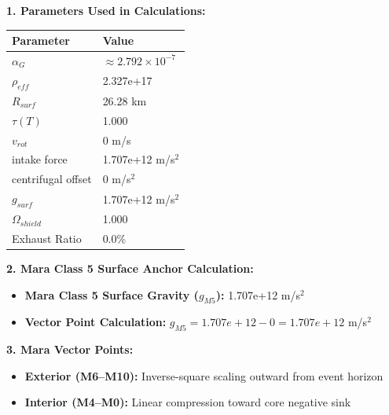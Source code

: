 \documentclass[11pt, a4paper]{article}
\begin{document}
\vspace{0.5em}
\noindent \textbf{1. Parameters Used in Calculations:}
\begin{center}
  \begin{tabular}{|l|l|}
    \hline
    \textbf{Parameter} & \textbf{Value} \\ \hline
    $\alpha_G$ & $\approx 2.792 \times 10^{-7}$ \\ \hline
    $\rho_{eff}$ & 2.327e+17 \\ \hline
    $R_{surf}$ & 26.28 km \\ \hline
    $\tau(T)$ & 1.000 \\ \hline
    $v_{rot}$ & 0 m/s \\ \hline
    intake force & 1.707e+12 m/s$^2$ \\ \hline
    centrifugal offset & 0 m/s$^2$ \\ \hline
    $g_{surf}$ & 1.707e+12 m/s$^2$ \\ \hline
    $\Omega_{shield}$ & 1.000 \\ \hline
    Exhaust Ratio & 0.0\% \\ \hline
  \end{tabular}
\end{center}

\vspace{0.5em}
\noindent \textbf{2. Mara Class 5 Surface Anchor Calculation:}
\begin{itemize}
  \item \textbf{Mara Class 5 Surface Gravity ($g_{M5}$):} 1.707e+12 m/s$^2$
  \item \textbf{Vector Point Calculation:} $g_{M5} = 1.707e+12 - 0 = 1.707e+12$ m/s$^2$
\end{itemize}

\vspace{0.5em}
\noindent \textbf{3. Mara Vector Points:}
\begin{itemize}
  \item \textbf{Exterior (M6--M10):} Inverse-square scaling outward from event horizon
  \item \textbf{Interior (M4--M0):} Linear compression toward core negative sink
\end{itemize}
\end{document}
